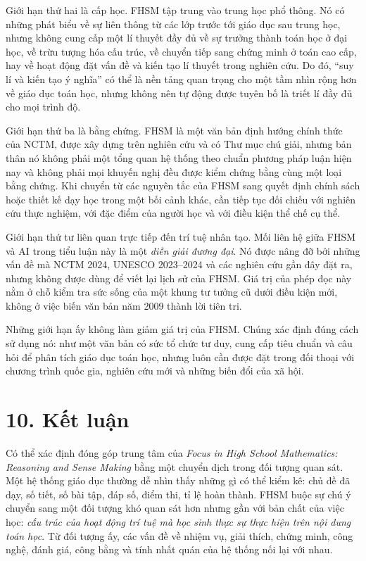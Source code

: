 Giới hạn thứ hai là cấp học. FHSM tập trung vào trung học phổ thông. Nó có
những phát biểu về sự liên thông từ các lớp trước tới giáo dục sau trung học,
nhưng không cung cấp một lí thuyết đầy đủ về sự trưởng thành toán học ở đại
học, về trừu tượng hóa cấu trúc, về chuyển tiếp sang chứng minh ở toán cao
cấp, hay về hoạt động đặt vấn đề và kiến tạo lí thuyết trong nghiên cứu. Do
đó, ``suy lí và kiến tạo ý nghĩa'' có thể là nền tảng quan trọng cho một tầm
nhìn rộng hơn về giáo dục toán học, nhưng không nên tự động được tuyên bố là
triết lí đầy đủ cho mọi trình độ.

Giới hạn thứ ba là bằng chứng. FHSM là một văn bản định hướng chính thức của
NCTM, được xây dựng trên nghiên cứu và có Thư mục chú giải, nhưng bản thân nó
không phải một tổng quan hệ thống theo chuẩn phương pháp luận hiện nay và
không phải mọi khuyến nghị đều được kiểm chứng bằng cùng một loại bằng chứng.
Khi chuyển từ các nguyên tắc của FHSM sang quyết định chính sách hoặc thiết
kế dạy học trong một bối cảnh khác, cần tiếp tục đối chiếu với nghiên cứu thực
nghiệm, với đặc điểm của người học và với điều kiện thể chế cụ thể.

Giới hạn thứ tư liên quan trực tiếp đến trí tuệ nhân tạo. Mối liên hệ giữa
FHSM và AI trong tiểu luận này là một \emph{diễn giải đương đại}. Nó được nâng
đỡ bởi những vấn đề mà NCTM 2024, UNESCO 2023--2024 và các nghiên cứu gần đây
đặt ra, nhưng không được dùng để viết lại lịch sử của FHSM. Giá trị của phép
đọc này nằm ở chỗ kiểm tra sức sống của một khung tư tưởng cũ dưới điều kiện
mới, không ở việc biến văn bản năm 2009 thành lời tiên tri.

Những giới hạn ấy không làm giảm giá trị của FHSM. Chúng xác định đúng cách
sử dụng nó: như một văn bản có sức tổ chức tư duy, cung cấp tiêu chuẩn và câu
hỏi để phân tích giáo dục toán học, nhưng luôn cần được đặt trong đối thoại
với chương trình quốc gia, nghiên cứu mới và những biến đổi của xã hội.

\section*{10. Kết luận}

Có thể xác định đóng góp trung tâm của \emph{Focus in High School
Mathematics: Reasoning and Sense Making} bằng một chuyển dịch trong đối tượng
quan sát. Một hệ thống giáo dục thường dễ nhìn thấy những gì có thể kiểm kê:
chủ đề đã dạy, số tiết, số bài tập, đáp số, điểm thi, tỉ lệ hoàn thành. FHSM
buộc sự chú ý chuyển sang một đối tượng khó quan sát hơn nhưng gần với bản
chất của việc học: \emph{cấu trúc của hoạt động trí tuệ mà học sinh thực sự
thực hiện trên nội dung toán học}. Từ đối tượng ấy, các vấn đề về nhiệm vụ,
giải thích, chứng minh, công nghệ, đánh giá, công bằng và tính nhất quán của hệ
thống nối lại với nhau.

